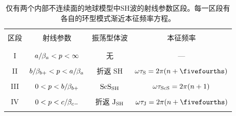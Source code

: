 \begin{table}[!b]
\centering
\begin{tabular}{|c|c|c|c|} \hline
& & & \\
区段 & 射线参数 & 振荡型体波 & 本征频率 \\
& & & \\ \hline
& & & \\
I & $a/\hspace{-0.2 mm}\beta_a < p<\infty$ & 无 & --- \\
& & & \\
II & $b/\hspace{-0.2 mm}\beta_{b+}<p<a/\hspace{-0.2 mm}\beta_a$ & 折返 SH &
  $\omega\tau_{\rm S}=2\pi(n+\fivefourths)$ \\
& & & \\
III & $0< p<b/\hspace{-0.2 mm}\beta_{b+}$ & ${\rm ScS}_{\rm SH}$ &
  $\omega\tau_{\rm ScS}=2\pi(n+1)$ \\
& & & \\
IV & $0< p<c/\hspace{-0.2 mm}\beta_{c-}$ & 折返 ${\rm J}_{\rm SH}$ &
  $\omega\tau_{\rm J}=2\pi(n+\fivefourths)$ \\
& & & \\ \hline
\end{tabular}
\caption[SH modes]{仅有两个内部不连续面的地球模型中SH波的射线参数区段。每一区段有各自的环型模式渐近本征频率方程。}
\label{table:SH}
\end{table}

